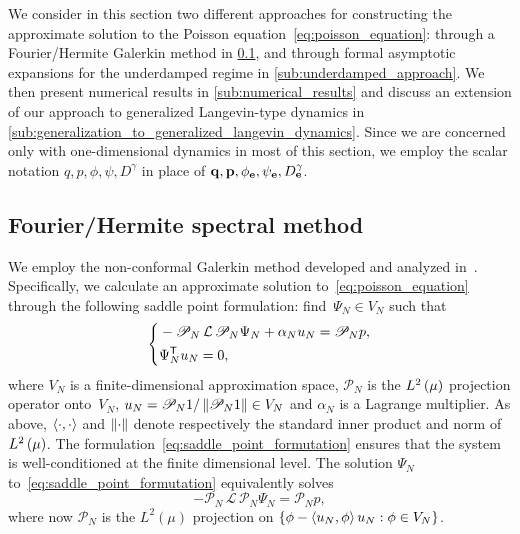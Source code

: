 \documentclass[11pt,a4paper]{article}
\begin{document}
We consider in this section two different approaches for constructing the approximate solution to the Poisson equation~\eqref{eq:poisson_equation}:
through a Fourier/Hermite Galerkin method in \cref{sub:galerkin_approach},
and through formal asymptotic expansions for the underdamped regime in \cref{sub:underdamped_approach}.
We then present numerical results in \cref{sub:numerical_results}
and discuss an extension of our approach to generalized Langevin-type dynamics in \cref{sub:generalization_to_generalized_langevin_dynamics}.
Since we are concerned only with one-dimensional dynamics in most of this section,
we employ the scalar notation $q, p, \phi, \psi, D^{\gamma}$ in place of $\boldsymbol{\mathbf q}, \boldsymbol{\mathbf p}, \phi_{\boldsymbol{\mathbf e}}, \psi_{\boldsymbol{\mathbf e}}, D^{\gamma}_{\boldsymbol{\mathbf e}}$.

\subsection{Fourier/Hermite spectral method}%
\label{sub:galerkin_approach}
We employ the non-conformal Galerkin method developed and analyzed in~\cite{roussel2018spectral}.
Specifically, we calculate an approximate solution to~\eqref{eq:poisson_equation} through the following saddle point formulation:
find~$\Psi_N \in V_N$ such that
\begin{align}
  \label{eq:saddle_point_formutation}
  \left\{
    \begin{aligned}
       & - \mathscr P_N \, \mathcal L \, \mathscr P_N \Psi_N + \alpha_N u_N = \mathscr P_N p, \\
       & \Psi_N^\mathsf T u_N = 0,
    \end{aligned}
  \right.
\end{align}
where $V_N$ is a finite-dimensional approximation space,
$\mathscr P_N$ is the $\lp{2}{\mu}$ projection operator onto~$V_N$,
$u_N = \mathscr P_N 1 / \norm{\mathscr P_N 1} \in V_N$
and $\alpha_N$ is a Lagrange multiplier.
As above,
$\ip{\cdot}{\cdot}$ and $\norm{\cdot}$ denote respectively the standard inner product and norm of $\lp{2}{\mu}$.
The formulation~\eqref{eq:saddle_point_formutation} ensures
that the system is well-conditioned at the finite dimensional level.
The solution $\Psi_N$ to~\eqref{eq:saddle_point_formutation} equivalently solves
\[
    - \mathcal P_N \, \mathcal L \, \mathcal P_N \Psi_N = \mathcal P_N p,
\]
where now $\mathcal P_N$ is the $L^2(\mu)$ projection on $\{\phi - \ip{u_N}{\phi} u_N : \phi \in V_N\}$.
\end{document}
